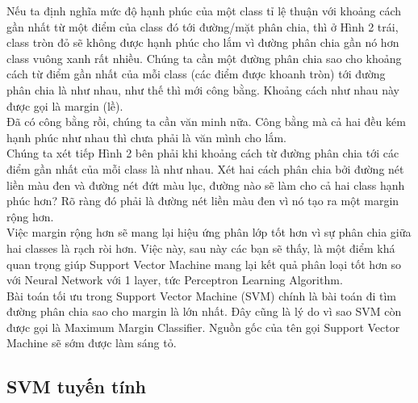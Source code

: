 \documentclass[12pt,a4paper]{article}
\begin{document}
Nếu ta định nghĩa mức độ hạnh phúc của một class tỉ lệ thuận với khoảng cách gần nhất từ một điểm của class đó tới đường/mặt phân chia, thì ở Hình 2 trái, class tròn đỏ sẽ không được hạnh phúc cho lắm vì đường phân chia gần nó hơn class vuông xanh rất nhiều. Chúng ta cần một đường phân chia sao cho khoảng cách từ điểm gần nhất của mỗi class (các điểm được khoanh tròn) tới đường phân chia là như nhau, như thế thì mới công bằng. Khoảng cách như nhau này được gọi là margin (lề).\\
Đã có công bằng rồi, chúng ta cần văn minh nữa. Công bằng mà cả hai đều kém hạnh phúc như nhau thì chưa phải là văn mình cho lắm.\\
Chúng ta xét tiếp Hình 2 bên phải khi khoảng cách từ đường phân chia tới các điểm gần nhất của mỗi class là như nhau. Xét hai cách phân chia bởi đường nét liền màu đen và đường nét đứt màu lục, đường nào sẽ làm cho cả hai class hạnh phúc hơn? Rõ ràng đó phải là đường nét liền màu đen vì nó tạo ra một margin rộng hơn.\\
Việc margin rộng hơn sẽ mang lại hiệu ứng phân lớp tốt hơn vì sự phân chia giữa hai classes là rạch ròi hơn. Việc này, sau này các bạn sẽ thấy, là một điểm khá quan trọng giúp Support Vector Machine mang lại kết quả phân loại tốt hơn so với Neural Network với 1 layer, tức Perceptron Learning Algorithm.\\
Bài toán tối ưu trong Support Vector Machine (SVM) chính là bài toán đi tìm đường phân chia sao cho margin là lớn nhất. Đây cũng là lý do vì sao SVM còn được gọi là Maximum Margin Classifier. Nguồn gốc của tên gọi Support Vector Machine sẽ sớm được làm sáng tỏ.
\subsection{SVM tuyến tính}
\end{document}
